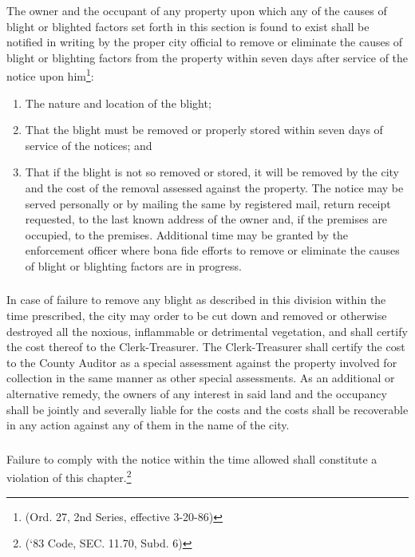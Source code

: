\subsubsection{}
The owner and the occupant of any property upon which any of the causes of blight or blighted factors set forth in this section is found to exist shall be notified in writing by the proper city official to remove or eliminate the causes of blight or blighting factors from the property within seven days after service of the notice upon him\footnote{(Ord. 27, 2nd Series, effective 3-20-86)}:
\begin{enumerate}[{\indent}a)]
    \item The nature and location of the blight; 
    \item That the blight must be removed or properly stored within seven days of service of the notices; and 
    \item That if the blight is not so removed or stored, it will be removed by the city and the cost of the removal assessed against the property. The notice may be served personally or by mailing the same by registered mail, return receipt requested, to the last known address of the owner and, if the premises are occupied, to the premises. Additional time may be granted by the enforcement officer where bona fide efforts to remove or eliminate the causes of blight or blighting factors are in progress.
\end{enumerate}
\subsubsection{}
In case of failure to remove any blight as described in this division within the time prescribed, the city may order to be cut down and removed or otherwise destroyed all the noxious, inflammable or detrimental vegetation, and shall certify the cost thereof to the Clerk-Treasurer. The Clerk-Treasurer shall certify the cost to the County Auditor as a special assessment against the property involved for collection in the same manner as other special assessments. As an additional or alternative remedy, the owners of any interest in said land and the occupancy shall be jointly and severally liable for the costs and the costs shall be recoverable in any action against any of them in the name of the city.
\subsubsection{}
Failure to comply with the notice within the time allowed shall constitute a violation of this chapter.\footnote{(‘83 Code, SEC. 11.70, Subd. 6)}
